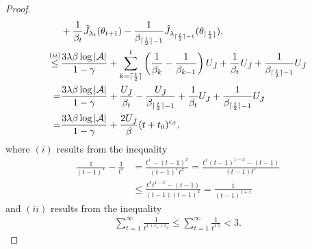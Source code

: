 \documentclass[twoside,11pt]{article}
\DeclarePairedDelimiter{\ceil}{\lceil}{\rceil}
\newcommand{\fA}{\mathcal{A}}
\newcommand{\na}{{|\fA|}}
\numberwithin{assucounter}{section}
\begin{document}
\begin{proof}
\begin{align}
    &+ \frac{1}{\beta_t} \tilde J_{\lambda_t}(\theta_{t+1}) - \frac{1}{\beta_{\ceil{\frac{t}{2}}-1}} \tilde J_{\lambda_{\ceil{\frac{t}{2}} - 1}}(\theta_{\ceil{\frac{t}{2}}}), \\
    \overset{(ii)}{\leq} & \frac{3\lambda\beta \log \na}{1-\gamma} + \sum_{k=\ceil{\frac{t}{2}}}^t\left(\frac{1}{\beta_k} - \frac{1}{\beta_{k-1}} \right) U_{\tilde J}  + \frac{1}{\beta_t} U_{\tilde J} + \frac{1}{\beta_{\ceil{\frac{t}{2}}-1}} U_{\tilde J} \\
    = & \frac{3\lambda\beta \log \na}{1-\gamma} + \frac{U_{\tilde J}}{\beta_t} - \frac{U_{\tilde J}}{\beta_{\ceil{\frac{t}{2}}-1}} + \frac{1}{\beta_t} U_{\tilde J} + \frac{1}{\beta_{\ceil{\frac{t}{2}}-1}} U_{\tilde J}  \\
    = &\frac{3\lambda\beta \log \na}{1-\gamma} + \frac{2U_{\tilde J}}{\beta} (t+t_0)^{\epsilon_\beta},
\end{align}
where $(i)$ results from the inequality
\begin{align}
  \frac{1}{(t-1)^x} - \frac{1}{t^x} &= \frac{t^x - (t-1)^x}{(t-1)^x t^x} = \frac{t^x(t-1)^{1-x} - (t-1)}{(t-1)t^x} \\
  &\leq \frac{t^x t^{1-x} - (t-1)}{(t-1)(t-1)^x} = \frac{1}{(t-1)^{1+x}}
\end{align}
and $(ii)$ results from the inequality
\begin{align}
  \sum_{t=1}^\infty \frac{1}{t^{1+\epsilon_\lambda + \epsilon_\beta}} \leq \sum_{t=1}^\infty \frac{1}{t^{1.5}} < 3.
\end{align}
\end{proof} 
    
\vskip 0.2in
% 

\end{document}
